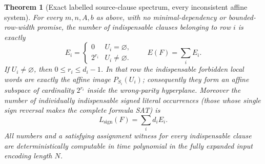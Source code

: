 \documentclass[11pt]{article}
\newtheorem{theorem}{Theorem}
\begin{document}
\begin{theorem}[Exact labelled source-clause spectrum, every inconsistent affine system]
For every $m,n,A,b$ as above, with no minimal-dependency or bounded-row-width promise, the number of indispensable clauses belonging to row $i$ is exactly
\[
\boxed{E_i=\begin{cases}0&U_i=\varnothing,\\ 2^{r_i}&U_i\ne\varnothing.\end{cases}}
\qquad E(F)=\sum_i E_i .
\]
If $U_i\ne\varnothing$, then $0\le r_i\le d_i-1$. In that row the indispensable forbidden local words are \emph{exactly} the affine image $P_{S_i}(U_i)$; consequently they form an affine subspace of cardinality $2^{r_i}$ inside the wrong-parity hyperplane. Moreover the number of individually indispensable \emph{signed literal occurrences} (those whose single sign reversal makes the complete formula SAT) is
\[
\boxed{L_{\mathrm{sign}}(F)=\sum_i d_i E_i.}
\]
All numbers and a satisfying assignment witness for every indispensable clause are deterministically computable in time polynomial in the \emph{fully expanded input encoding length} $N$.
\end{theorem}
\end{document}
